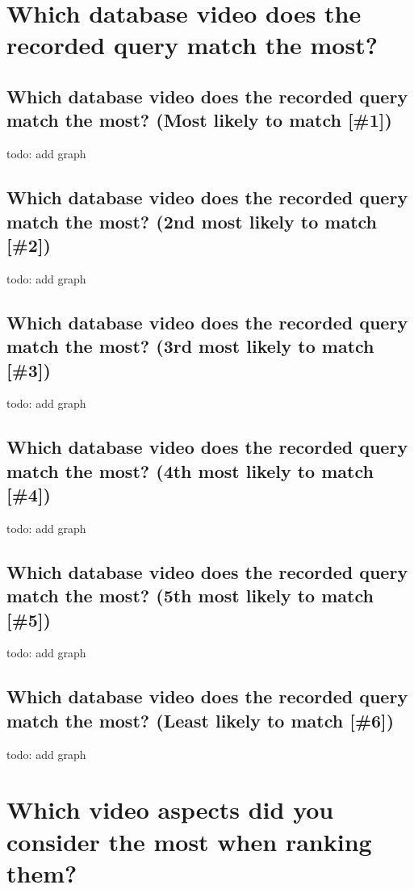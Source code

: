 \section{Which database video does the recorded query match the most?}

\subsection{Which database video does the recorded query match the most? (Most likely to match [\#1])}

todo: add graph

\subsection{Which database video does the recorded query match the most? (2nd most likely to match [\#2])}

todo: add graph

\subsection{Which database video does the recorded query match the most? (3rd most likely to match [\#3])}

todo: add graph

\subsection{Which database video does the recorded query match the most? (4th most likely to match [\#4])}

todo: add graph

\subsection{Which database video does the recorded query match the most? (5th most likely to match [\#5])}

todo: add graph


\subsection{Which database video does the recorded query match the most? (Least likely to match [\#6])}

todo: add graph

\section{Which video aspects did you consider the most when ranking them?}

